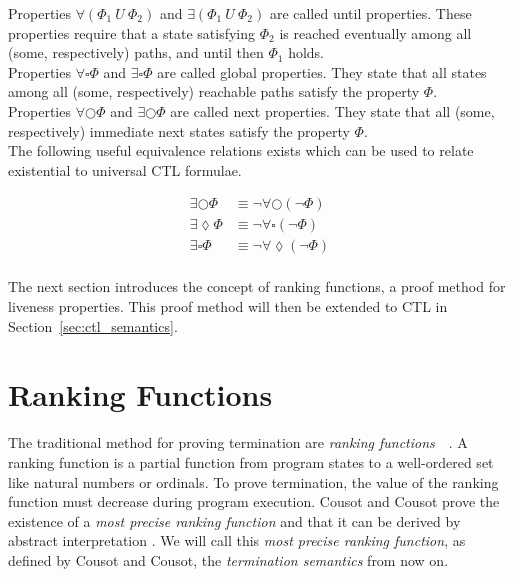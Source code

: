\documentclass[11pt,a4paper,titlepage]{article}
\theoremstyle{definition}
\begin{document}
Properties $\forall(\Phi_1 \ U \ \Phi_2)$ and $\exists(\Phi_1 \ U \ \Phi_2)$ are called \textsf{until} properties.
These properties require that a state satisfying $\Phi_2$ is reached eventually among all (some, respectively) paths, 
and until then $\Phi_1$ holds.\\

Properties $\forall\square\Phi$ and $\exists\square\Phi$ are called \textsf{global} properties. They state that all states among 
all (some, respectively) reachable paths satisfy the property $\Phi$.\\

Properties $\forall\bigcirc\Phi$ and $\exists\bigcirc\Phi$ are called \textsf{next} properties. They state that all (some, respectively) immediate next
states satisfy the property $\Phi$.\\

The following useful equivalence relations 
exists which can be used to relate existential to universal CTL formulae.

\begin{align*}
    \exists\bigcirc\Phi &\equiv \neg \forall\bigcirc(\neg \Phi)\\ 
    \exists\lozenge\Phi &\equiv \neg \forall\square(\neg \Phi) \\
    \exists\square\Phi  &\equiv \neg \forall\lozenge(\neg \Phi) \\
\end{align*}

The next section introduces the concept of ranking functions, a proof method for liveness properties. 
This proof method will then be extended to CTL in Section~\ref{sec:ctl_semantics}. 

\section{Ranking Functions}\label{sec:ranking_functions}

The traditional method for proving termination are \textit{ranking functions}~\cite{Touring49}~\cite{Floyd67}.
A ranking function is a partial function from program states to a well-ordered set like natural numbers or ordinals. 
To prove termination, the value of the ranking function must decrease during program execution. 
Cousot and Cousot prove the existence of a \textit{most precise ranking function} and that it can be derived 
by abstract interpretation \cite{CousotCousot-POPL12}. 
We will call this \textit{most precise ranking function}, as defined by Cousot and Cousot, 
the \textit{termination semantics} from now on.
\end{document}
